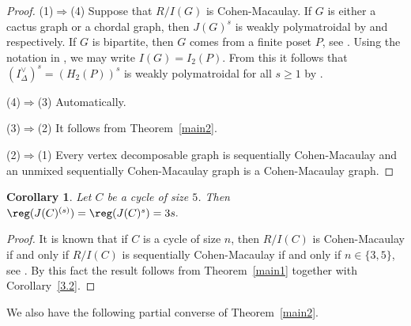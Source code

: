 \documentclass[12pt]{amsart}
\newtheorem{Corollary}[Theorem]{Corollary}
\begin{document}
\begin{proof}
(1)$\Rightarrow$(4)  Suppose that $R/I(G)$ is Cohen-Macaulay. If $G$ is either a cactus graph or a chordal graph,  then $J(G)^{s}$ is weakly polymatroidal by  \cite[Theorem 4.3]{M} and \cite[Theorem 1.7]{M1} respectively.  If $G$ is bipartite, then $G$ comes from  a finite poset $P$, see \cite[Theorem 9.1.3]{HH}.  Using the notation in \cite{EHM}, we may write  $I(G)=I_2(P)$. From this it follows that  $(I_{\Delta}^{\vee})^s=(H_2(P))^s$ is weakly polymatroidal for all $s\geq 1$ by \cite[Theorem 2.2]{EHM}.

(4)$\Rightarrow$(3) Automatically.

(3)$\Rightarrow$(2) It follows from Theorem~\ref{main2}.

(2)$\Rightarrow$(1) Every vertex decomposable graph is sequentially Cohen-Macaulay and an unmixed sequentially Cohen-Macaulay  graph is a Cohen-Macaulay graph.
\end{proof}

\begin{Corollary} Let $C$ be a cycle of size $5$. Then $\reg(J(C)^{(s)})=\reg(J(C)^s)=3s.$
\end{Corollary}

\begin{proof} It is known that if $C$ is a cycle of size $n$, then $R/I(C)$ is Cohen-Macaulay if and only if $R/I(C)$ is sequentially Cohen-Macaulay if and only if $n\in \{3,5\}$, see \cite[Proposition 4.1]{FT}. By this fact the result follows from Theorem~\ref{main1} together with Corollary~\ref{3.2}.
\end{proof}


We also have the following  partial converse of Theorem~\ref{main2}.
\end{document}
